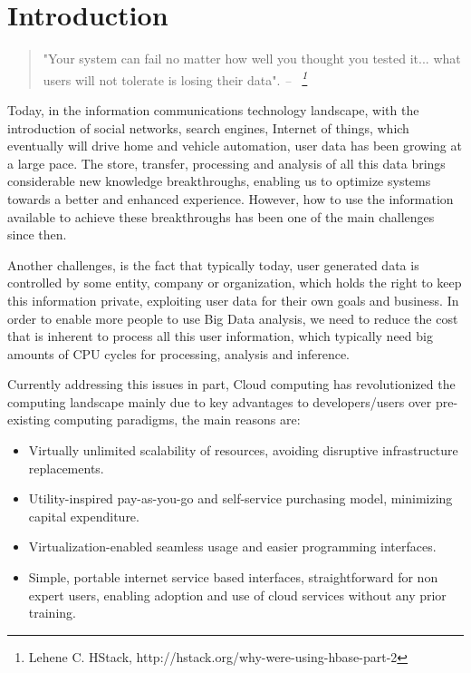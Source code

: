 \chapter{Introduction}\label{ch:intro}

\begin{quotation}
    "Your system can fail no matter how well you thought you tested it... what users will not tolerate is losing their data".
    {\small\it 
        -- ~\footnote{Lehene C. HStack, http://hstack.org/why-were-using-hbase-part-2} }
\end{quotation}

Today, in the information communications technology landscape, with the introduction of social networks, search engines, Internet of things, which eventually will drive home and vehicle automation, user data has been growing at a large pace. The store, transfer, processing and analysis of all this data brings considerable new knowledge breakthroughs, enabling us to optimize systems towards a better and enhanced experience. However, how to use the information available to achieve these breakthroughs has been one of the main challenges since then. 

Another challenges, is the fact that typically today, user generated data is controlled by some entity, company or organization, which holds the right to keep this information private, exploiting user data for their own goals and business. In order to enable more people to use Big Data analysis, we need to reduce the cost that is inherent to process all this user information, which typically need big amounts of CPU cycles for processing, analysis and inference.

Currently addressing this issues in part, Cloud computing has revolutionized the computing landscape mainly due to key advantages to developers/users over pre-existing computing paradigms, the main reasons are:

\begin{itemize}
    \item Virtually unlimited scalability of resources, avoiding disruptive infrastructure replacements.
    \item Utility-inspired pay-as-you-go and self-service purchasing model, minimizing capital expenditure.
    \item Virtualization-enabled seamless usage and easier programming interfaces.
    \item Simple, portable internet service based interfaces, straightforward for non expert users, enabling adoption and use of cloud services without any prior training.
\end{itemize}

